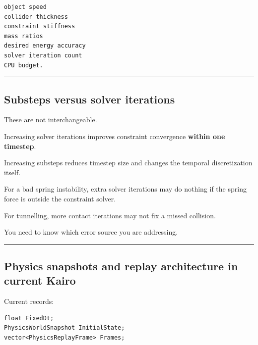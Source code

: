\begin{verbatim}
object speed
collider thickness
constraint stiffness
mass ratios
desired energy accuracy
solver iteration count
CPU budget.
\end{verbatim}

\begin{center}\rule{0.5\linewidth}{0.5pt}\end{center}

\subsection{Substeps versus solver iterations}\label{06-engine-ii-ch038-substeps-versus-solver-iterations}

\hypertarget{06-engine-ii-ch038-substeps-versus-solver-iterations}{}

These are not interchangeable.

Increasing solver iterations improves constraint convergence \textbf{within one timestep}.

Increasing substeps reduces timestep size and changes the temporal discretization itself.

For a bad spring instability, extra solver iterations may do nothing if the spring force is outside the constraint solver.

For tunnelling, more contact iterations may not fix a missed collision.

You need to know which error source you are addressing.

\begin{center}\rule{0.5\linewidth}{0.5pt}\end{center}

\subsection{Physics snapshots and replay architecture in current Kairo}\label{06-engine-ii-ch038-physics-snapshots-and-replay-architecture-in-current-kairo}

\hypertarget{06-engine-ii-ch038-physics-snapshots-and-replay-architecture-in-current-kairo}{}

Current  records:

\begin{verbatim}
float FixedDt;
PhysicsWorldSnapshot InitialState;
vector<PhysicsReplayFrame> Frames;
\end{verbatim}

